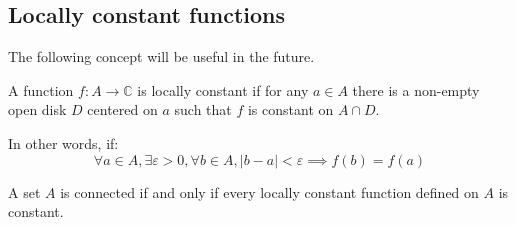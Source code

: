 \subsection{Locally constant functions}
The following concept will be useful in the future.

\begin{defi}
    A function $f: A \rightarrow \mathbb{C}$ is locally constant if for any $a\in A$ there is a non-empty open disk $D$ centered on $a$ such that $f$ is constant on $A\cap D$.

    In other words, if:
    $$ \forall a \in A, \exists \varepsilon >0, \forall b \in A, |b-a|< \varepsilon \implies f(b) = f(a) $$
\end{defi}

\begin{thm*}
    A set $A$ is connected if and only if every locally constant function defined on $A$ is constant.
\end{thm*}

